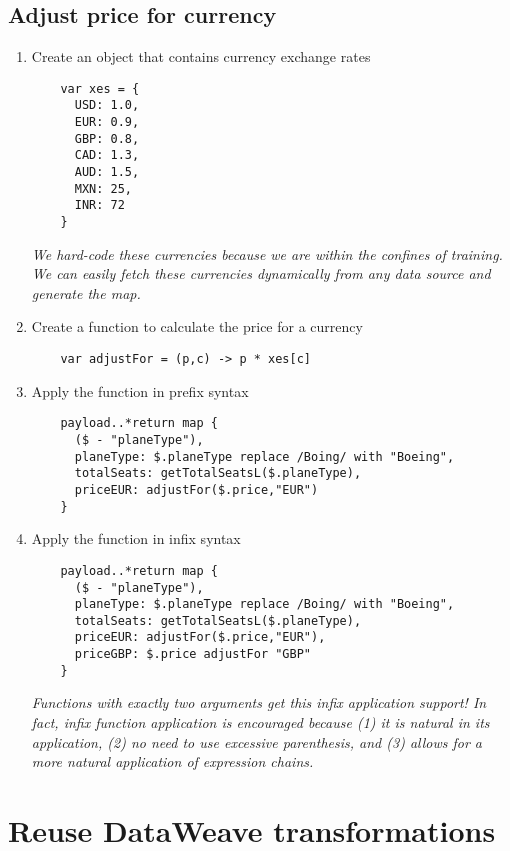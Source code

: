 \subsection{Adjust price for currency}
\begin{enumerate}[resume*]
\item Create an object that contains currency exchange rates
  \begin{lstlisting}
    var xes = {
      USD: 1.0,
      EUR: 0.9,
      GBP: 0.8,
      CAD: 1.3,
      AUD: 1.5,
      MXN: 25,
      INR: 72
    }
  \end{lstlisting}
  \emph{
    We hard-code these currencies because we are within the confines of training.  We can easily fetch these
    currencies dynamically from any data source and generate the map.
  }
\item Create a function to calculate the price for a currency
  \begin{lstlisting}
    var adjustFor = (p,c) -> p * xes[c]
  \end{lstlisting}
\item Apply the function in prefix syntax
  \begin{lstlisting}
    payload..*return map {
      ($ - "planeType"),
      planeType: $.planeType replace /Boing/ with "Boeing",
      totalSeats: getTotalSeatsL($.planeType),
      priceEUR: adjustFor($.price,"EUR")
    }
  \end{lstlisting}
\item Apply the function in infix syntax
  \begin{lstlisting}
    payload..*return map {
      ($ - "planeType"),
      planeType: $.planeType replace /Boing/ with "Boeing",
      totalSeats: getTotalSeatsL($.planeType),
      priceEUR: adjustFor($.price,"EUR"),
      priceGBP: $.price adjustFor "GBP"
    }    
  \end{lstlisting}
  \emph{
    Functions with exactly two arguments get this infix application support!  In fact, infix function
    application is encouraged because (1) it is natural in its application, (2) no need to use excessive
    parenthesis, and (3) allows for a more natural application of expression chains.
  }
\end{enumerate}

\section{Reuse DataWeave transformations}

